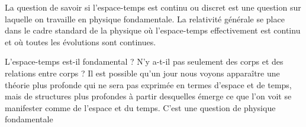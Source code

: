 La question de savoir si l'espace-temps est continu ou discret est
une question sur laquelle on travaille en physique fondamentale. La relativité
générale se place dans le cadre standard de la physique où l'espace-temps
effectivement est continu et où toutes les évolutions sont continues.

L'espace-temps est-il fondamental ? N'y a-t-il pas seulement des corps et des
relations entre corps ? Il est possible qu'un jour nous voyons apparaître une
théorie plus profonde qui ne sera pas exprimée en termes d'espace et de temps,
mais de structures plus profondes à partir desquelles émerge ce que l'on voit
se manifester comme de l'espace et du temps. C'est une question de physique
fondamentale







